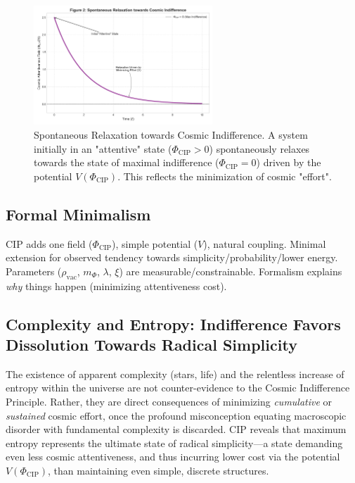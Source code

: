 \documentclass[11pt, a4paper]{article}
\newcommand{\subt}[1]{\mathrm{#1}}
\begin{document}
\begin{figure}[H]
    \centering
    \includegraphics[width=0.6\textwidth]{CIP_Relaxation.png}
    \caption[Spontaneous Relaxation towards Cosmic Indifference]{Spontaneous Relaxation towards Cosmic Indifference. A system initially in an "attentive" state ($\Phi_{\subt{CIP}} > 0$) spontaneously relaxes towards the state of maximal indifference ($\Phi_{\subt{CIP}} = 0$) driven by the potential $V(\Phi_{\subt{CIP}})$. This reflects the minimization of cosmic "effort".}
    \label{fig:relaxation}
\end{figure}


\subsection{Formal Minimalism}

CIP adds one field ($\Phi_{\subt{CIP}}$), simple potential ($V$), natural coupling. Minimal extension for observed tendency towards simplicity/probability/lower energy. Parameters ($\rho_{\subt{vac}}$, $m_{\Phi}$, $\lambda$, $\xi$) are measurable/constrainable. Formalism explains \textit{why} things happen (minimizing attentiveness cost).

\subsection{Complexity and Entropy: Indifference Favors Dissolution Towards Radical Simplicity} \label{sec:entropy_complexity}

The existence of apparent complexity (stars, life) and the relentless increase of entropy within the universe are not counter-evidence to the Cosmic Indifference Principle. Rather, they are direct consequences of minimizing \textit{cumulative} or \textit{sustained} cosmic effort, once the profound misconception equating macroscopic disorder with fundamental complexity is discarded. CIP reveals that maximum entropy represents the ultimate state of radical simplicity—a state demanding even less cosmic attentiveness, and thus incurring lower cost via the potential $V(\Phi_{\subt{CIP}})$, than maintaining even simple, discrete structures.
\end{document}
